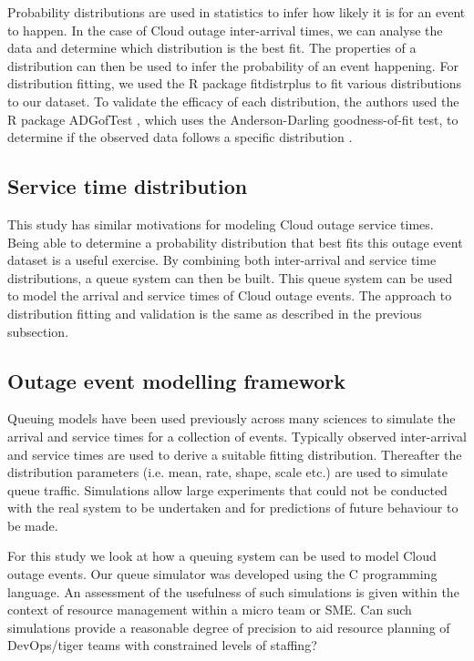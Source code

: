 \documentclass[5p]{elsarticle}
\begin{document}
Probability distributions are used in statistics to infer how likely it is for an event to happen. In the case of Cloud outage inter-arrival times,  we can analyse the data and determine which distribution is the best fit. The properties of a distribution can then be used to infer the probability of an event happening. For distribution fitting, we used the R package fitdistrplus \cite{fitdistrplus} to fit various distributions to our dataset. To validate the efficacy of each distribution,  the authors used the R package ADGofTest \cite{ADGoF}, which uses the Anderson-Darling goodness-of-fit test, to determine if the observed data follows a specific distribution \cite {anderson1952asymptotic}.

\subsection{Service time distribution}

This study has similar motivations for modeling Cloud outage service times. Being able to determine a probability distribution that best fits this outage event dataset is a useful exercise. By combining both inter-arrival and service time distributions, a queue system can then be built. This queue system can be used to model the arrival and service times of Cloud outage events. The approach to distribution fitting and validation is the same as described in the previous subsection. 

\subsection{Outage event modelling framework}

Queuing models have been used previously across many sciences to simulate the arrival and service times for a collection of events. Typically observed inter-arrival and service times are used to derive a suitable fitting distribution. Thereafter the distribution parameters (i.e. mean, rate, shape, scale etc.) are used to simulate queue traffic. Simulations allow large experiments that could not be conducted with the real system to be undertaken and for predictions of future behaviour to be made.



For this study we look at how a queuing system can be used to model Cloud outage events. Our queue simulator was developed using the C programming language.  An assessment of the usefulness of such simulations is given within the context of resource management within a micro team or SME. Can such simulations provide a reasonable degree of precision to aid resource planning of DevOps/tiger teams with constrained levels of staffing?
\end{document}
